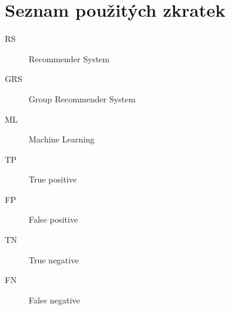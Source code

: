 \chapter*{Seznam použitých zkratek}

\raggedright
\begin{description}
    \item [RS] Recommender System
    \item [GRS] Group Recommender System
    \item [ML] Machine Learning
    \item [TP] True positive 
    \item [FP] False positive
    \item [TN] True negative
    \item [FN] False negative
\end{description}

